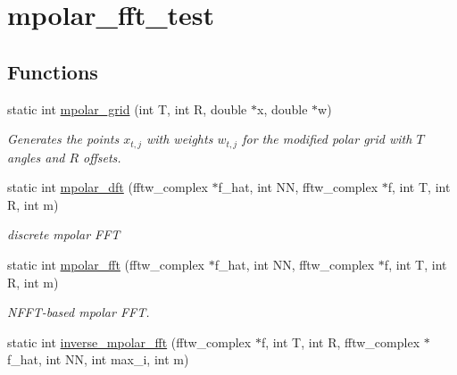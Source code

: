 \hypertarget{group__applications__polarFFT__mpolar}{
\section{mpolar\_\-fft\_\-test}
\label{group__applications__polarFFT__mpolar}
}
\subsection*{Functions}
\begin{CompactItemize}
\item 
static int \hyperlink{group__applications__polarFFT__mpolar_g08d0441aceedbcb98b985ee5aa121952}{mpolar\_\-grid} (int T, int R, double $\ast$x, double $\ast$w)
\begin{CompactList}\small\item\em Generates the points $x_{t,j}$ with weights $w_{t,j}$ for the modified polar grid with $T$ angles and $R$ offsets. \item\end{CompactList}\item 
\hypertarget{group__applications__polarFFT__mpolar_gee9902054200ea50d90b5d290bff8c71}{
static int \hyperlink{group__applications__polarFFT__mpolar_gee9902054200ea50d90b5d290bff8c71}{mpolar\_\-dft} (fftw\_\-complex $\ast$f\_\-hat, int NN, fftw\_\-complex $\ast$f, int T, int R, int m)}
\label{group__applications__polarFFT__mpolar_gee9902054200ea50d90b5d290bff8c71}

\begin{CompactList}\small\item\em discrete mpolar FFT \item\end{CompactList}\item 
\hypertarget{group__applications__polarFFT__mpolar_g55b2f979a5c69176a73f59eb0312b53d}{
static int \hyperlink{group__applications__polarFFT__mpolar_g55b2f979a5c69176a73f59eb0312b53d}{mpolar\_\-fft} (fftw\_\-complex $\ast$f\_\-hat, int NN, fftw\_\-complex $\ast$f, int T, int R, int m)}
\label{group__applications__polarFFT__mpolar_g55b2f979a5c69176a73f59eb0312b53d}

\begin{CompactList}\small\item\em NFFT-based mpolar FFT. \item\end{CompactList}\item 
\hypertarget{group__applications__polarFFT__mpolar_g5d0560e898b722ee5fe09acc485bbec8}{
static int \hyperlink{group__applications__polarFFT__mpolar_g5d0560e898b722ee5fe09acc485bbec8}{inverse\_\-mpolar\_\-fft} (fftw\_\-complex $\ast$f, int T, int R, fftw\_\-complex $\ast$f\_\-hat, int NN, int max\_\-i, int m)}
\label{group__applications__polarFFT__mpolar_g5d0560e898b722ee5fe09acc485bbec8}


\end{CompactItemize}
